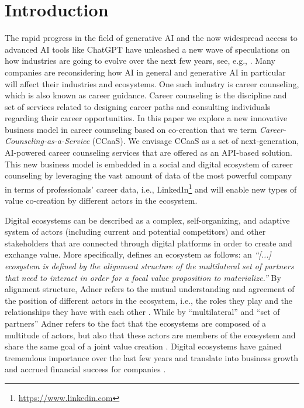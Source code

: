 \section{Introduction}
\label{sec:introduction}

The rapid progress in the field of generative AI and the now widespread access to advanced AI tools like ChatGPT
 have unleashed a new wave of speculations on how industries are going to evolve over the next few years, see,
 e.g., \cite{chuiHowGenerativeAI2022,chuiWhatEveryCEO2023}. Many companies are reconsidering how 
AI in general and generative AI in particular will affect their industries and ecosystems. One such industry is
career counseling, which is also known as career guidance. Career counseling is the discipline and set of services
related to designing career paths and consulting individuals regarding their career opportunities.
In this paper we explore a new innovative business model in career counseling based on co-creation that we term
\textit{Career-Counseling-as-a-Service} (CCaaS). We envisage CCaaS as a set of next-generation, AI-powered career
counseling services that are offered as an API-based solution. This new business model is embedded in a social and
digital ecosystem of career counseling by leveraging the vast amount of data of the most powerful company in terms
of professionals' career data, i.e., LinkedIn\footnote[1]{\url{https://www.linkedin.com}} and will enable new types
of value co-creation by different actors in the ecosystem.

Digital ecosystems can be described as a complex, self-organizing, and adaptive system of actors (including current and
potential competitors) and other stakeholders that are connected through digital platforms in order to create and exchange
value. More specifically, \cite{adnerEcosystemStructureActionable2017} defines an ecosystem as follows: an \textit{``[...]
ecosystem is defined by the alignment structure of the multilateral set of partners that need to interact in order for a
focal value proposition to materialize.''} By alignment structure, Adner refers to the mutual understanding and agreement
of the position of different actors in the ecosystem, i.e., the roles they play and the relationships they have with each other
\citep[p. 42]{adnerEcosystemStructureActionable2017}. While by ``multilateral'' and ``set of partners'' Adner refers to
the fact that the ecosystems are composed of a multitude of actors, but also that these actors are members of the ecosystem
and share the same goal of a joint value creation \citep[p. 42-43]{adnerEcosystemStructureActionable2017}. Digital ecosystems
have gained tremendous importance over the last few years and translate into business growth and accrued financial success
for companies \citep{weillThrivingIncreasinglyDigital2015}.

